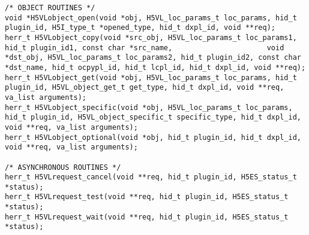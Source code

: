 \begin{appendices}
\begin{lstlisting}
/* OBJECT ROUTINES */
void *H5VLobject_open(void *obj, H5VL_loc_params_t loc_params, hid_t plugin_id, H5I_type_t *opened_type, hid_t dxpl_id, void **req);
herr_t H5VLobject_copy(void *src_obj, H5VL_loc_params_t loc_params1, hid_t plugin_id1, const char *src_name,                      void *dst_obj, H5VL_loc_params_t loc_params2, hid_t plugin_id2, const char *dst_name, hid_t ocpypl_id, hid_t lcpl_id, hid_t dxpl_id, void **req);
herr_t H5VLobject_get(void *obj, H5VL_loc_params_t loc_params, hid_t plugin_id, H5VL_object_get_t get_type, hid_t dxpl_id, void **req, va_list arguments);
herr_t H5VLobject_specific(void *obj, H5VL_loc_params_t loc_params, hid_t plugin_id, H5VL_object_specific_t specific_type, hid_t dxpl_id, void **req, va_list arguments);
herr_t H5VLobject_optional(void *obj, hid_t plugin_id, hid_t dxpl_id, void **req, va_list arguments);

/* ASYNCHRONOUS ROUTINES */
herr_t H5VLrequest_cancel(void **req, hid_t plugin_id, H5ES_status_t *status);
herr_t H5VLrequest_test(void **req, hid_t plugin_id, H5ES_status_t *status);
herr_t H5VLrequest_wait(void **req, hid_t plugin_id, H5ES_status_t *status);
\end{lstlisting}

\end{appendices}

